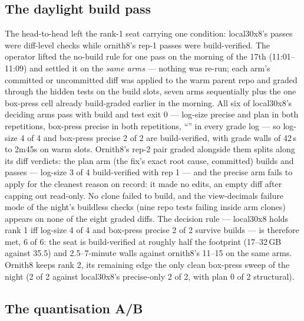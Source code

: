 \subsection{The daylight build pass}\label{sec:daylight}

The head-to-head left the rank-1 seat carrying one condition: local30x8's passes were diff-level checks while
ornith8's rep-1 passes were build-verified. The operator lifted the no-build rule for one pass on the morning of
the 17th (11:01--11:09) and settled it on the \emph{same arms} --- nothing was re-run; each arm's committed or
uncommitted diff was applied to the warm parent repo and graded through the hidden tests on the build slots,
seven arms sequentially plus the one box-press cell already build-graded earlier in the morning. All six of
local30x8's deciding arms pass with build and test exit 0 --- log-size precise and plan in both repetitions,
box-press precise in both repetitions, ``'' in every grade log --- so log-size 4 of 4 and
box-press precise 2 of 2 are build-verified, with grade walls of 42\,s to 2m45s on warm slots. Ornith8's rep-2
pair graded alongside them splits along its diff verdicts: the plan arm (the fix's exact root cause, committed)
builds and passes --- log-size 3 of 4 build-verified with rep 1 --- and the precise arm fails to apply for the
cleanest reason on record: it made no edits, an empty diff after capping out read-only. No clone failed to
build, and the view-decimals failure mode of the night's buildless checks (nine repo tests failing inside arm
clones) appears on none of the eight graded diffs. The decision rule --- local30x8 holds rank 1 iff log-size
4 of 4 and box-press precise 2 of 2 survive builds --- is therefore met, 6 of 6: the seat is build-verified at
roughly half the footprint (17--32\,GB against 35.5) and 2.5--7-minute walls against ornith8's 11--15 on the
same arms. Ornith8 keeps rank 2, its remaining edge the only clean box-press sweep of the night (2 of 2 against
local30x8's precise-only 2 of 2, with plan 0 of 2 structural).

\subsection{The quantisation A/B}\label{sec:quant}

